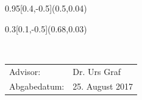 
\begin{titlepage}
	\setlength{\TPHorizModule}{\paperwidth}
	\setlength{\TPVertModule}{\paperheight}
	
	
	
	\begin{textblock}{0.95}[0.4,-0.5](0.5,0.04)
	\end{textblock}
	\begin{textblock}{0.3}[0.1,-0.5](0.68,0.03)
	\end{textblock}
    \vspace*{6cm}
    \begin{center}
    	\Huge{\color{HeadBlue}{Eine ROS Anbindung für EEROS\\}}
		\vspace*{5cm}
		\normalsize
      	{}\\
		\vspace*{2cm}      	


    \vspace*{3cm}
    \color{HeadBlue}
    \begin{tabular}{p{4cm}l}
      Advisor: & Dr. Urs Graf \\
      Abgabedatum: & 25. August 2017
    \end{tabular}\\
    \end{center}
  \end{titlepage}



